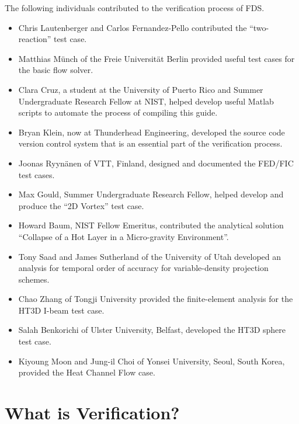 \documentclass[11pt]{book}
\begin{document}
\label{acksection}

The following individuals contributed to the verification process of FDS.
\begin{itemize}
\item Chris Lautenberger and Carlos Fernandez-Pello contributed the ``two-reaction'' test case.
\item Matthias M\"{u}nch of the Freie Universit\"{a}t Berlin provided useful test cases for the basic flow solver.
\item Clara Cruz, a student at the University of Puerto Rico and Summer Undergraduate Research Fellow at NIST, helped develop useful Matlab scripts to automate the process of compiling this guide.
\item Bryan Klein, now at Thunderhead Engineering, developed the source code version control system that is an essential part of the verification process.
\item Joonas Ryyn\"{a}nen of VTT, Finland, designed and documented the FED/FIC test cases.
\item Max Gould, Summer Undergraduate Research Fellow, helped develop and produce the ``2D Vortex'' test case.
\item Howard Baum, NIST Fellow Emeritus, contributed the analytical solution ``Collapse of a Hot Layer in a Micro-gravity Environment''.
\item Tony Saad and James Sutherland of the University of Utah developed an analysis for temporal order of accuracy for variable-density projection schemes.
\item Chao Zhang of Tongji University provided the finite-element analysis for the HT3D I-beam test case.
\item Salah Benkorichi of Ulster University, Belfast, developed the HT3D sphere test case.
\item Kiyoung Moon and Jung-il Choi of Yonsei University, Seoul, South Korea, provided the Heat Channel Flow case.
\end{itemize}


\cleardoublepage
{}
{}
\tableofcontents

\cleardoublepage
{}
{}
\listoffigures

\cleardoublepage
{}
{}
\listoftables

\mainmatter


\chapter{What is Verification?}
\end{document}
